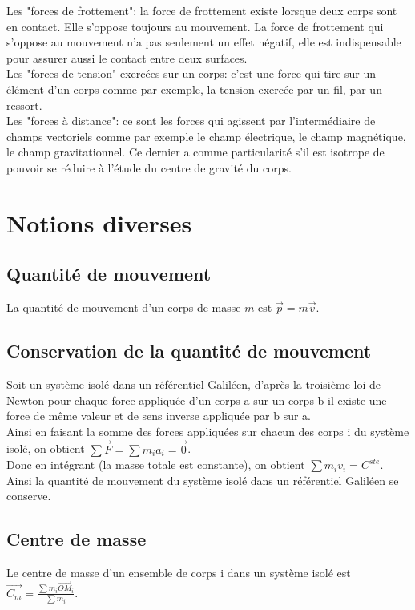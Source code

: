 \documentclass[a4paper,10pt]{book} %
\begin{document}
Les "forces de frottement": la force de frottement existe lorsque deux corps sont en contact. Elle s'oppose toujours au mouvement. La force de frottement qui s'oppose au mouvement n'a pas seulement un effet négatif, elle est indispensable pour assurer aussi le contact entre deux surfaces.\\

Les "forces de tension" exercées sur un corps: c'est une force qui tire sur un élément d'un corps comme par exemple, la tension exercée par un fil, par un ressort.\\

Les "forces à distance": ce sont les forces qui agissent par l'intermédiaire de champs vectoriels comme par exemple le champ électrique, le champ magnétique, le champ gravitationnel. Ce dernier a comme particularité s'il est isotrope de pouvoir se réduire à l'étude du centre de gravité du corps.


\newpage

\section{Notions diverses}
\subsection{Quantité de mouvement}
La quantité de mouvement d'un corps de masse $m$ est $\overrightarrow{p}=m\overrightarrow{v}$.

\subsection{Conservation de la quantité de mouvement}
Soit un système isolé dans un référentiel Galiléen, d'après la troisième loi de Newton pour chaque force appliquée d'un corps a sur un corps b il existe une force de même valeur et de sens inverse appliquée par b sur a.\\

Ainsi en faisant la somme des forces appliquées sur chacun des corps i du système isolé, on obtient $\sum\overrightarrow{F}=\sum m_ia_i=\overrightarrow{0}$.\\

Donc en intégrant (la masse totale est constante), on obtient $\sum m_iv_i=C^{ste}$. Ainsi la quantité de mouvement du système isolé dans un référentiel Galiléen se conserve.

\subsection{Centre de masse}
Le centre de masse d'un ensemble de corps i dans un système isolé est $\displaystyle \overrightarrow{C_m}=\frac{\sum m_i \overrightarrow{OM}_i}{\sum m_i}$.
\end{document}
